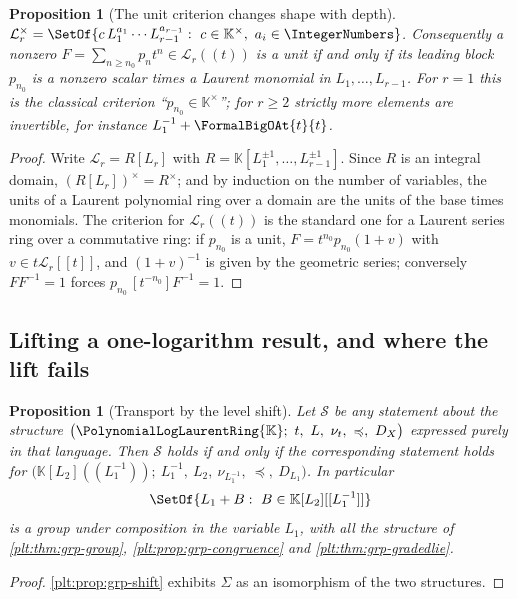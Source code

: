 \documentclass[11pt,oneside]{article}
\theoremstyle{plain}
\newtheorem{proposition}[theorem]{Proposition}
\theoremstyle{definition}
\theoremstyle{remark}
\newcommand{\K}{\mathbb{K}}
\newcommand{\PLlau}{\PolynomialLogLaurentRing{\K}}       %
\newcommand{\ordt}{\nu_{t}}                              %
\newcommand{\DX}{D_{X}}                                  %
\newcommand{\preceqdom}{\preccurlyeq}
\begin{document}
\begin{proposition}[The unit criterion changes shape with depth]
\label{plt:prop:grp-multilog-units}
\(\mathcal L_r^{\times}
 =\SetOf{c\,L_1^{a_1}\cdots L_{r-1}^{a_{r-1}}:\ c\in\K^{\times},\
  a_i\in\IntegerNumbers}\).
Consequently a nonzero \(F=\sum_{n\ge n_0}p_nt^n\in\mathcal L_r((t))\) is a
unit if and only if its leading block \(p_{n_0}\) is a nonzero scalar times a
Laurent monomial in \(L_1,\ldots,L_{r-1}\).  For \(r=1\) this is the classical
criterion ``\(p_{n_0}\in\K^{\times}\)''; for \(r\ge2\) strictly more elements
are invertible, for instance \(L_1^{-1}+\FormalBigOAt{t}{t}\).
\end{proposition}

\begin{proof}
Write \(\mathcal L_r=R[L_r]\) with
\(R=\K[L_1^{\pm1},\ldots,L_{r-1}^{\pm1}]\).  Since \(R\) is an integral domain,
\((R[L_r])^{\times}=R^{\times}\); and by induction on the number of variables,
the units of a Laurent polynomial ring over a domain are the units of the base
times monomials.  The criterion for \(\mathcal L_r((t))\) is the standard one
for a Laurent series ring over a commutative ring: if \(p_{n_0}\) is a unit,
\(F=t^{n_0}p_{n_0}(1+v)\) with \(v\in t\mathcal L_r[[t]]\), and \((1+v)^{-1}\)
is given by the geometric series; conversely \(FF^{-1}=1\) forces
\(p_{n_0}\,[t^{-n_0}]F^{-1}=1\).
\end{proof}

\subsection{Lifting a one-logarithm result, and where the lift fails}

\begin{proposition}[Transport by the level shift]\label{plt:prop:grp-transport}
Let \(\mathcal S\) be any statement about the structure
\(\bigl(\PLlau;\ t,\ L,\ \ordt,\ \preceqdom,\ \DX\bigr)\) expressed purely in
that language.  Then \(\mathcal S\) holds if and only if the corresponding
statement holds for
\(\bigl(\K[L_2]((L_1^{-1}));\ L_1^{-1},\ L_2,\
 \nu_{L_1^{-1}},\ \preceqdom,\ D_{L_1}\bigr)\).  In particular
\[
  \SetOf{L_1+B:\ B\in\K[L_2][[L_1^{-1}]]}
\]
is a group under composition in the variable \(L_1\), with all the structure of
\cref{plt:thm:grp-group}, \cref{plt:prop:grp-congruence} and
\cref{plt:thm:grp-gradedlie}.
\end{proposition}

\begin{proof}
\cref{plt:prop:grp-shift} exhibits \(\Sigma\) as an isomorphism of the two
structures.
\end{proof}
\end{document}
